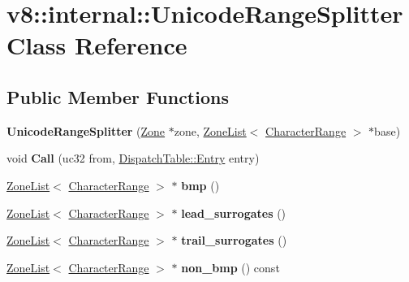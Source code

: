 \hypertarget{classv8_1_1internal_1_1UnicodeRangeSplitter}{}\section{v8\+:\+:internal\+:\+:Unicode\+Range\+Splitter Class Reference}
\label{classv8_1_1internal_1_1UnicodeRangeSplitter}
\subsection*{Public Member Functions}
\begin{DoxyCompactItemize}
\item 
\mbox{\label{classv8_1_1internal_1_1UnicodeRangeSplitter_af20e11d725b27ce0db862385b9cf24db}} 
{\bfseries Unicode\+Range\+Splitter} (\mbox{\hyperlink{classv8_1_1internal_1_1Zone}{Zone}} $\ast$zone, \mbox{\hyperlink{classv8_1_1internal_1_1ZoneList}{Zone\+List}}$<$ \mbox{\hyperlink{classv8_1_1internal_1_1CharacterRange}{Character\+Range}} $>$ $\ast$base)
\item 
\mbox{\label{classv8_1_1internal_1_1UnicodeRangeSplitter_a45089e928fe902bb7b8ae6905037e4f5}} 
void {\bfseries Call} (uc32 from, \mbox{\hyperlink{classv8_1_1internal_1_1DispatchTable_1_1Entry}{Dispatch\+Table\+::\+Entry}} entry)
\item 
\mbox{\label{classv8_1_1internal_1_1UnicodeRangeSplitter_a21e9c9d11b05df1d6e97ac742a5175c9}} 
\mbox{\hyperlink{classv8_1_1internal_1_1ZoneList}{Zone\+List}}$<$ \mbox{\hyperlink{classv8_1_1internal_1_1CharacterRange}{Character\+Range}} $>$ $\ast$ {\bfseries bmp} ()
\item 
\mbox{\label{classv8_1_1internal_1_1UnicodeRangeSplitter_a5e31b400610ed987aae75acdfb14fb95}} 
\mbox{\hyperlink{classv8_1_1internal_1_1ZoneList}{Zone\+List}}$<$ \mbox{\hyperlink{classv8_1_1internal_1_1CharacterRange}{Character\+Range}} $>$ $\ast$ {\bfseries lead\+\_\+surrogates} ()
\item 
\mbox{\label{classv8_1_1internal_1_1UnicodeRangeSplitter_a1e0c1c29db4817209024a5b9b8e48fa5}} 
\mbox{\hyperlink{classv8_1_1internal_1_1ZoneList}{Zone\+List}}$<$ \mbox{\hyperlink{classv8_1_1internal_1_1CharacterRange}{Character\+Range}} $>$ $\ast$ {\bfseries trail\+\_\+surrogates} ()
\item 
\mbox{\label{classv8_1_1internal_1_1UnicodeRangeSplitter_a2cc642c451cbb36315026788c4a64a77}} 
\mbox{\hyperlink{classv8_1_1internal_1_1ZoneList}{Zone\+List}}$<$ \mbox{\hyperlink{classv8_1_1internal_1_1CharacterRange}{Character\+Range}} $>$ $\ast$ {\bfseries non\+\_\+bmp} () const
\end{DoxyCompactItemize}


